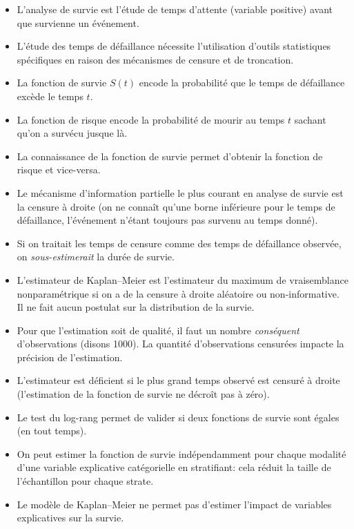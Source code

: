 \documentclass[
  11pt,
  letterpaper,
]{scrbook}
\providecommand{\tightlist}{%
  \setlength{\itemsep}{0pt}\setlength{\parskip}{0pt}}\usepackage{longtable,booktabs,array}
\theoremstyle{definition}
\theoremstyle{remark}
\begin{document}
\begin{tcolorbox}[enhanced jigsaw, coltitle=black, left=2mm, opacitybacktitle=0.6, colback=white, leftrule=.75mm, colframe=quarto-callout-note-color-frame, toprule=.15mm, colbacktitle=quarto-callout-note-color!10!white, opacityback=0, bottomtitle=1mm, toptitle=1mm, rightrule=.15mm, title=\textcolor{quarto-callout-note-color}{\faInfo}\hspace{0.5em}{En résumé}, breakable, titlerule=0mm, arc=.35mm, bottomrule=.15mm]

\begin{itemize}
\tightlist
\item
  L'analyse de survie est l'étude de temps d'attente (variable positive)
  avant que survienne un événement.
\item
  L'étude des temps de défaillance nécessite l'utilisation d'outils
  statistiques spécifiques en raison des mécanismes de censure et de
  troncation.
\item
  La fonction de survie \(S(t)\) encode la probabilité que le temps de
  défaillance excède le temps \(t\).
\item
  La fonction de risque encode la probabilité de mourir au temps \(t\)
  sachant qu'on a survécu jusque là.
\item
  La connaissance de la fonction de survie permet d'obtenir la fonction
  de risque et vice-versa.
\item
  Le mécanisme d'information partielle le plus courant en analyse de
  survie est la censure à droite (on ne connaît qu'une borne inférieure
  pour le temps de défaillance, l'événement n'étant toujours pas survenu
  au temps donné).
\item
  Si on traitait les temps de censure comme des temps de défaillance
  observée, on \emph{sous-estimerait} la durée de survie.
\item
  L'estimateur de Kaplan--Meier est l'estimateur du maximum de
  vraisemblance nonparamétrique si on a de la censure à droite aléatoire
  ou non-informative. Il ne fait aucun postulat sur la distribution de
  la survie.
\item
  Pour que l'estimation soit de qualité, il faut un nombre
  \emph{conséquent} d'observations (disons 1000). La quantité
  d'observations censurées impacte la précision de l'estimation.
\item
  L'estimateur est déficient si le plus grand temps observé est censuré
  à droite (l'estimation de la fonction de survie ne décroît pas à
  zéro).
\item
  Le test du log-rang permet de valider si deux fonctions de survie sont
  égales (en tout temps).
\item
  On peut estimer la fonction de survie indépendamment pour chaque
  modalité d'une variable explicative catégorielle en stratifiant: cela
  réduit la taille de l'échantillon pour chaque strate.
\item
  Le modèle de Kaplan--Meier ne permet pas d'estimer l'impact de
  variables explicatives sur la survie.
\end{itemize}

\end{tcolorbox}
\end{document}
